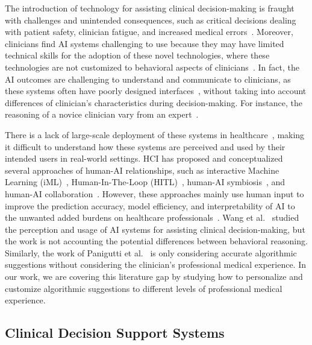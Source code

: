 The introduction of technology for assisting clinical decision-making is fraught with challenges and unintended consequences, such as critical decisions dealing with patient safety, clinician fatigue, and increased medical errors~\cite{10.1093/jamia/ocab291, 10.1117/12.2613082, doi:10.1148/radiol.212631}.
Moreover, clinicians find AI systems challenging to use because they may have limited technical skills for the adoption of these novel technologies, where these technologies are not customized to behavioral aspects of clinicians~\cite{CALISTO2022102922}.
In fact, the AI outcomes are challenging to understand and communicate to clinicians, as these systems often have poorly designed interfaces~\cite{10.1145/3555157}, without taking into account differences of clinician's characteristics during decision-making.
For instance, the reasoning of a novice clinician vary from an expert~\cite{Edgar2022}.

There is a lack of large-scale deployment of these systems in healthcare~\cite{10.1145/3411764.3445432, SU202328, ZAPPATORE20231}, making it difficult to understand how these systems are perceived and used by their intended users in real-world settings.
HCI has proposed and conceptualized several approaches of human-AI relationships, such as interactive Machine Learning (iML)~\cite{10.1145/604045.604056}, Human-In-The-Loop (HITL)~\cite{holzinger2016interactive, 10.1145/3397481.3450668}, human-AI symbiosis~\cite{JARRAHI2018577}, and human-AI collaboration~\cite{10.1145/3411764.3445432}.
However, these approaches mainly use human input to improve the prediction accuracy, model efficiency, and interpretability of AI to the unwanted added burdens on healthcare professionals~\cite{10.1145/3555157, 10.1145/3209889.3209897}.
Wang et al.~\cite{10.1145/3411764.3445432} studied the perception and usage of AI systems for assisting clinical decision-making, but the work is not accounting the potential differences between behavioral reasoning.
Similarly, the work of Panigutti et al.~\cite{10.1145/3491102.3502104} is only considering accurate algorithmic suggestions without considering the clinician's professional medical experience.
In our work, we are covering this literature gap by studying how to personalize and customize algorithmic suggestions to different levels of professional medical experience.

\subsection{Clinical Decision Support Systems}
\label{sec:chap006002003}

